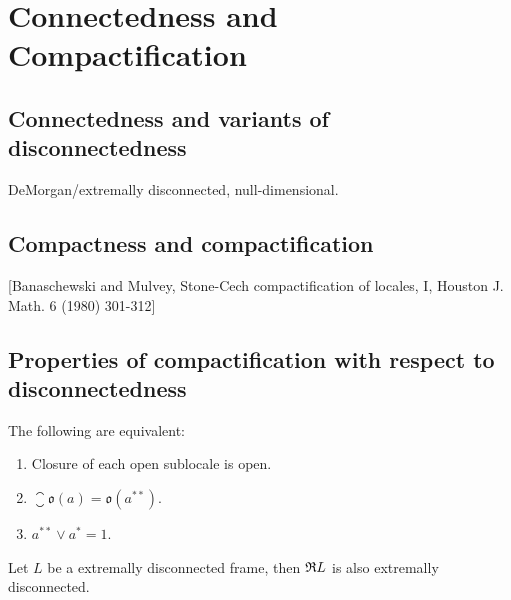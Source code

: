 \chapter{Connectedness and Compactification}

\section{Connectedness and variants of disconnectedness}
DeMorgan/extremally disconnected, null-dimensional.
\section{Compactness and compactification}

[Banaschewski and Mulvey, Stone-Cech compactification of locales, I, Houston J. Math. 6 (1980) 301-312]

\section{Properties of compactification with respect to disconnectedness}
\begin{lemma}
    The following are equivalent:

    \begin{enumerate}
        \item Closure of each open sublocale is open.
        \item $\closure{\mathfrak{o}(a)} = \mathfrak{o}(a^{**})$.
        \item $a^{**} \vee a^* = 1$.
    \end{enumerate}
\end{lemma}

\begin{proposition}\label{p:extrDiscPreserv}
    Let $L$ be a extremally disconnected frame, then $\mathfrak{R} L$ is also extremally disconnected.
\end{proposition}

